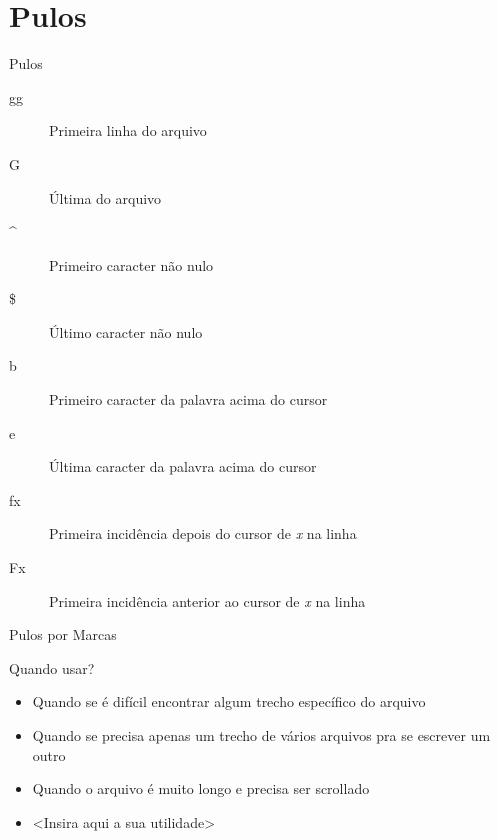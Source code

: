 \section{Pulos}
\begin{frame}{Pulos}
	\begin{description}
		\item[gg] Primeira linha do arquivo
		\pause \item[G] Última do arquivo 
		\pause \item[\textasciicircum] Primeiro caracter não nulo
		\pause \item[\$] Último caracter não nulo
		\pause \item[b] Primeiro caracter da palavra acima do cursor
		\pause \item[e] Última caracter da palavra acima do cursor
		\pause \item[fx] Primeira incidência depois do cursor de \textit{x} na linha
		\pause \item[Fx] Primeira incidência anterior ao cursor de \textit{x} na linha
	\end{description}
\end{frame}
\begin{frame}{Pulos por Marcas}
\begin{block}{Quando usar?}
	\begin{itemize}
		\item Quando se é difícil encontrar algum trecho específico do arquivo
		\item Quando se precisa apenas um trecho de vários arquivos pra se escrever um outro
		\item Quando o arquivo é muito longo e precisa ser scrollado
		\item \textless{}Insira aqui a sua utilidade\textgreater
	\end{itemize}
\end{block}
\end{frame}
